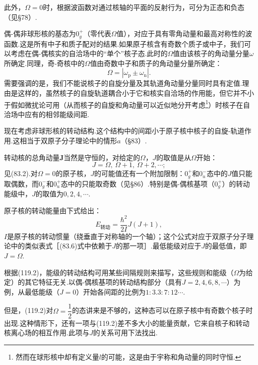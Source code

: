 此外，$\Omega=0$时，根据波函数对通过核轴的平面的反射行为，可分为正态和负态（见§78）.

偶-偶非球形核的基态为$0_g^+$（零代表$\Omega$值），对应于具有零角动量和最高对称性的波函数.这是所有中子和质子配对的结果.如果原子核含有奇数个质子或中子，我们可以考虑在偶-偶核实的自洽场中的“单个”核子态.此时的$\Omega$值由该核子的角动量分量$\omega$所确定.同理，奇-奇核中的$\Omega$值由奇数中子和质子的角动量分量所确定：
\begin{equation*}
  \Omega=|\omega_\mathrm{p}\pm\omega_\mathrm{n}|.
\end{equation*}
需要强调的是，我们不能说核子的自旋分量及其轨道角动量分量同时具有定值.理由是这样的，虽然核子的自旋轨道耦合小于它和核实自洽场的作用能，但它并不小于假如微扰论可用（从而核子的自旋和角动量可以近似地分开考虑\footnote{然而在球形核中却有定义量$l$的可能，这是由于宇称和角动量的同时守恒.}）时核子在自洽场中应有的相邻能级间距.

现在考虑非球形核的转动结构.这个结构中的间距小于原子核中核子的自旋-轨道作用.这相当于双原子分子理论中的情形$a$（§83）.

转动核的总角动量$\boldsymbol{J}$当然是守恒的，对给定的$\Omega$，$J$的取值是从$\Omega$开始：
\begin{equation}
  J=\Omega,\ \Omega+1,\ \Omega+2,\cdots;
\end{equation}
见(83.2).对$\Omega=0$的原子核，$J$的可能值还有一个附加限制：$0_g^+$和$0_u^-$态中的$J$值只能取偶数，而$0_g^-$和$0_u^+$态中的只能取奇数（见§86）.特别是偶-偶核基项（$0_g^+$）的转动能级中，$J$的取值为$0,2,4,\cdots$.

原子核的转动能量由下式给出：
\begin{equation}
  E_{\text{转动}}=\frac{\hbar^2}{2I}J(J+1),
\end{equation}
$I$是原子核的转动惯量（绕垂直于对称轴的一个轴）；这个公式对应于双原子分子理论中的类似表式［(83.6)式中依赖于$J$的那一项］.最低能级对应于$J$的最低值，即$J=\Omega$.

根据(119.2)，能级的转动结构可用某些间隔规则来描写，这些规则和能级（$\Omega$为给定）的其它特征无关.以偶-偶核基项的转动结构部分（具有$J=2,4,6,8,\cdots$）为例，从最低能级（$J=0$）开始各间距的比例为$1:3.3:7:12\cdots$.

但是，(119.2)对$\Omega=\dfrac{1}{2}$的态讲来是不够的，这种态可以在原子核中有奇数个核子时出现.这种情形下，还有一项与(119.2)差不多大小的能量贡献，它来自核子和转动核离心场的相互作用.此项与$J$的关系可用下法找出.

